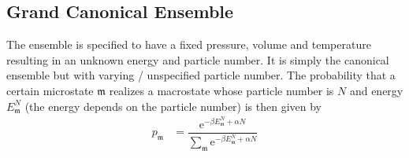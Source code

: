 \documentclass[a4paper,10pt]{article}
\numberwithin{equation}{section}
\begin{document}
\begin{multicols}{2}
\subsection{Grand Canonical Ensemble}
The ensemble is specified to have a fixed pressure, volume and temperature resulting in an unknown energy and particle number.
It is simply the canonical ensemble but with varying / unspecified particle number.
The probability that a certain microstate $\mathfrak{m}$ realizes a macrostate whose particle number is $N$ and energy $E_\mathfrak{m}^N$ (the energy depends on the particle number) is then given by
\begin{align} 
  p_\mathfrak{m} &= \dfrac{\text{e}^{-\beta E_\mathfrak{m}^N+\alpha N}}{\sum_{\mathfrak{m}}^{}\text{e}^{-\beta E_\mathfrak{m}^N+\alpha N}}
\end{align} 



\end{multicols}

%
%

\end{document}
